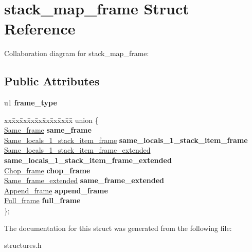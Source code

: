 \hypertarget{structstack__map__frame}{}\section{stack\+\_\+map\+\_\+frame Struct Reference}
\label{structstack__map__frame}


Collaboration diagram for stack\+\_\+map\+\_\+frame\+:
\subsection*{Public Attributes}
\begin{DoxyCompactItemize}
\item 
u1 {\bfseries frame\+\_\+type}\hypertarget{structstack__map__frame_ae7d53e0f8daea6d5738a88ffb94e575c}{}\label{structstack__map__frame_ae7d53e0f8daea6d5738a88ffb94e575c}

\item 
\begin{tabbing}
xx\=xx\=xx\=xx\=xx\=xx\=xx\=xx\=xx\=\kill
union \{\\
\>\hyperlink{structSame__frame}{Same\_frame} {\bfseries same\_frame}\\
\>\hyperlink{structSame__locals__1__stack__item__frame}{Same\_locals\_1\_stack\_item\_frame} {\bfseries same\_locals\_1\_stack\_item\_frame}\\
\>\hyperlink{structSame__locals__1__stack__item__frame__extended}{Same\_locals\_1\_stack\_item\_frame\_extended} {\bfseries same\_locals\_1\_stack\_item\_frame\_extended}\\
\>\hyperlink{structChop__frame}{Chop\_frame} {\bfseries chop\_frame}\\
\>\hyperlink{structSame__frame__extended}{Same\_frame\_extended} {\bfseries same\_frame\_extended}\\
\>\hyperlink{structAppend__frame}{Append\_frame} {\bfseries append\_frame}\\
\>\hyperlink{structFull__frame}{Full\_frame} {\bfseries full\_frame}\\
\}; \hypertarget{structstack__map__frame_a5c073aea2bad69d9058ef668105484da}{}\label{structstack__map__frame_a5c073aea2bad69d9058ef668105484da}
\\

\end{tabbing}\end{DoxyCompactItemize}


The documentation for this struct was generated from the following file\+:\begin{DoxyCompactItemize}
\item 
structures.\+h\end{DoxyCompactItemize}
